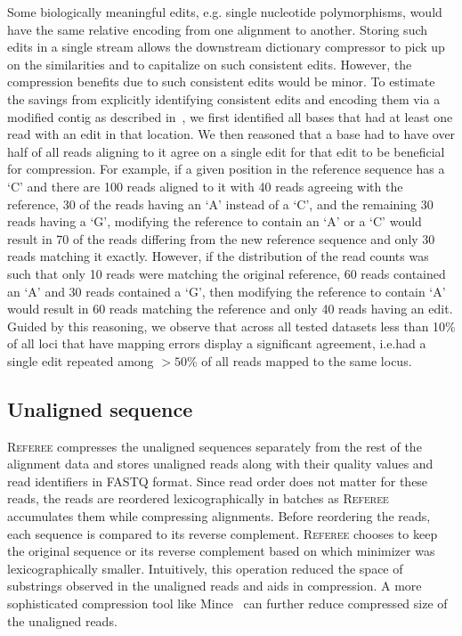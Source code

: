 \documentclass[12pt]{cmuthesis}
\newcommand{\refer}{\textsc{Referee}\xspace}
\begin{document}
  Some biologically meaningful edits, e.g. single nucleotide polymorphisms, would have the same relative encoding from one alignment to another. Storing such edits in a single stream allows the downstream dictionary compressor to pick up on the similarities and to capitalize on such consistent edits. However, the compression benefits due to such consistent edits would be minor. To estimate the savings from explicitly identifying consistent edits and encoding them via a modified contig as described in~\cite{Sahinalp2015}, we first identified all bases that had at least one read with an edit in that location. We then reasoned that a base had to have over half of all reads aligning to it agree on a single edit for that edit to be beneficial for compression. For example, if a given position in the reference sequence has a `C' and there are 100 reads aligned to it with 40 reads agreeing with the reference, 30 of the reads having an `A' instead of a `C', and the remaining 30 reads having a `G', modifying the reference to contain an `A' or a `C' would result in 70 of the reads differing from the new reference sequence and only 30 reads matching it exactly. However, if the distribution of the read counts was such that only 10 reads were matching the original reference, 60 reads contained an `A' and 30 reads contained a `G', then modifying the reference to contain `A' would result in 60 reads matching the reference and only 40 reads having an edit. Guided by this reasoning, we observe that across all tested datasets less than 10\% of all loci that have mapping errors display a significant agreement, i.e.\@ had a single edit repeated among $>50$\% of all reads mapped to the same locus.


  \subsection{Unaligned sequence}

  \refer compresses the unaligned sequences separately from the rest of the alignment data and stores unaligned reads along with their quality values and read identifiers in FASTQ format. Since read order does not matter for these reads, the reads are reordered lexicographically in batches as \refer accumulates them while compressing alignments. Before reordering the reads, each sequence is compared to its reverse complement. \refer chooses to keep the original sequence or its reverse complement based on which minimizer was lexicographically smaller. Intuitively, this operation reduced the space of substrings observed in the unaligned reads and aids in compression. A more sophisticated compression tool like Mince~\cite{Mince} can further reduce compressed size of the unaligned reads.
\end{document}
